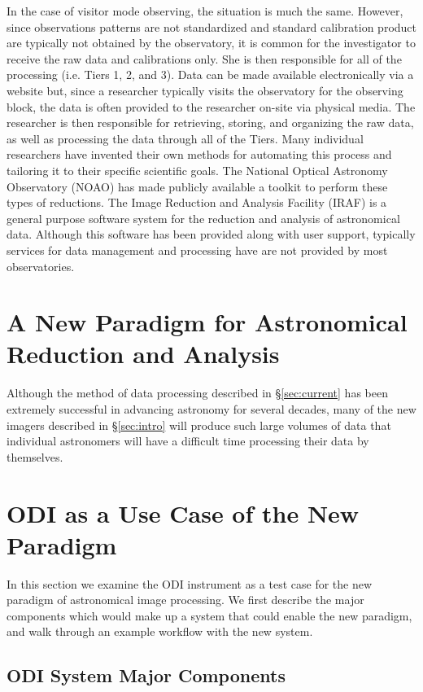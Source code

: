 \documentclass[10pt,conference]{IEEEtran}
\begin{document}
In the case of visitor mode observing, the situation is much the same. However, since observations patterns are not standardized and standard calibration product are typically not obtained by the observatory, it is common for the investigator to receive the raw data and calibrations only. She is then responsible for all of the processing (i.e. Tiers 1, 2, and 3). Data can be made available electronically via a website but, since a researcher typically visits the observatory for the observing block, the data is often provided to the researcher on-site via physical media. The researcher is then responsible for retrieving, storing, and organizing the raw data, as well as processing the data through all of the Tiers. Many individual researchers have invented their own methods for automating this process and tailoring it to their specific scientific goals. The National Optical Astronomy Observatory (NOAO) has made publicly available a toolkit to perform these types of reductions. The Image Reduction and Analysis Facility (IRAF) is a general purpose software system for the reduction and analysis of astronomical data. Although this software has been provided along with user support, typically services for data management and processing have are not provided by most observatories. 

\section{A New Paradigm for Astronomical Reduction and Analysis}\label{sec:rev}

Although the method of data processing described in \S\ref{sec:current} has been extremely successful in advancing astronomy for several decades, many of the new imagers described in \S\ref{sec:intro} will produce such large volumes of data that individual astronomers will have a difficult time
processing their data by themselves. 

\section{ODI as a Use Case of the New Paradigm}\label{sec:ODI}

In this section we examine the ODI instrument as a test case for the new paradigm of astronomical image processing. We first describe the major components which would make up a system that could enable the new paradigm, and walk through an example workflow with the new system. 

\subsection{ODI System Major Components}\label{sec:components}
\end{document}
